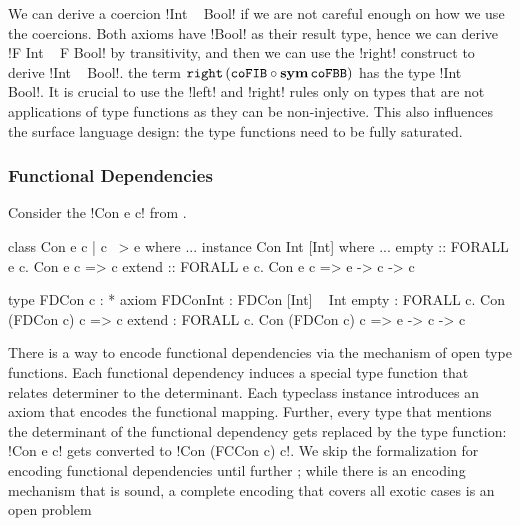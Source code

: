 \documentclass[manuscript,screen,nonacm]{acmart}
\begin{document}
We can derive a coercion !Int ~ Bool! if we are not careful enough on how we use the coercions. Both axioms have !Bool! as their result type, hence we can derive !F Int ~ F Bool! by transitivity, and then we can use the !right! construct to derive !Int ~ Bool!. the term $\texttt{right}\,({\texttt{coFIB}} \circ {\textbf{sym}\,{\texttt{coFBB}}})$ has the type !Int ~ Bool!. It is crucial to use the !left! and !right! rules only on types that are not applications of type functions as they can be non-injective. This also influences the surface language design: the type functions need to be fully saturated.

\subsubsection{Functional Dependencies}\label{sec:fc-encodes-fundeps}
Consider the !Con e c! from .

\begin{minipage}[ht]{0.5\linewidth}
\begin{code}
class Con e c | c ~> e where ...
instance Con Int [Int] where ...
empty :: FORALL e c. Con e c => c
extend :: FORALL e c. Con e c => e -> c -> c
\end{code}
\end{minipage}%
\begin{minipage}[ht]{0.5\linewidth}
\begin{code}
type FDCon c : *
axiom FDConInt : FDCon [Int] ~ Int
empty  : FORALL c. Con (FDCon c) c => c
extend : FORALL c. Con (FDCon c) c => e -> c -> c
\end{code}
\end{minipage}

There is a way to encode functional dependencies via the mechanism of open type functions. Each functional dependency induces a special type function that relates determiner to the determinant. Each typeclass instance introduces an axiom that encodes the functional mapping. Further, every type that mentions the determinant of the functional dependency gets replaced by the type function: !Con e c! gets converted to !Con (FCCon c) c!.
We skip the formalization for encoding functional dependencies until further ; while there is an encoding mechanism that is sound, a complete encoding that covers all exotic cases is an open problem
\end{document}
